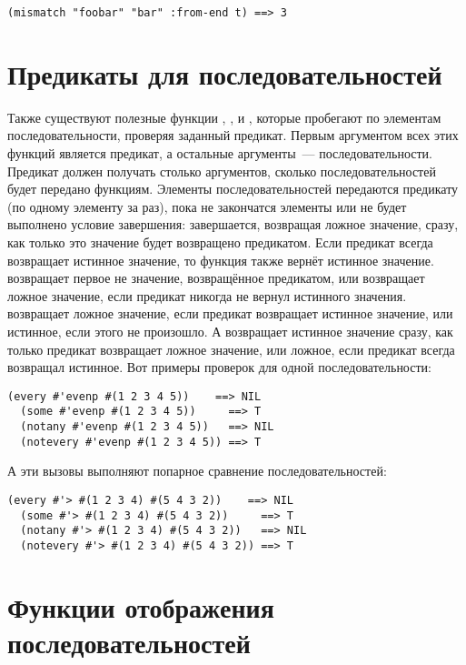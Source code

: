 \begin{lstlisting}[style=lisprepl]
  (mismatch "foobar" "bar" :from-end t) ==> 3
\end{lstlisting}

\section{Предикаты для последовательностей}

Также существуют полезные функции , ,  и
, которые пробегают по элементам последовательности, проверяя заданный
предикат.  Первым аргументом всех этих функций является предикат, а остальные аргументы~---
последовательности.  Предикат должен получать столько аргументов, сколько
последовательностей будет передано функциям.  Элементы последовательностей передаются
предикату (по одному элементу за раз), пока не закончатся элементы или не будет выполнено
условие завершения:  завершается, возвращая ложное значение, сразу, как только это
значение будет возвращено предикатом.  Если предикат всегда возвращает истинное значение,
то функция также вернёт истинное значение.   возвращает первое не 
значение, возвращённое предикатом, или возвращает ложное значение, если предикат никогда
не вернул истинного значения.  возвращает ложное значение, если предикат
возвращает истинное значение, или истинное, если этого не произошло.  А 
возвращает истинное значение сразу, как только предикат возвращает ложное значение, или
ложное, если предикат всегда возвращал истинное.  Вот примеры проверок для одной
последовательности:

\begin{lstlisting}[style=lisprepl]
  (every #'evenp #(1 2 3 4 5))    ==> NIL
  (some #'evenp #(1 2 3 4 5))     ==> T
  (notany #'evenp #(1 2 3 4 5))   ==> NIL
  (notevery #'evenp #(1 2 3 4 5)) ==> T
\end{lstlisting}

А эти вызовы выполняют попарное сравнение последовательностей:

\begin{lstlisting}[style=lisprepl]
  (every #'> #(1 2 3 4) #(5 4 3 2))    ==> NIL
  (some #'> #(1 2 3 4) #(5 4 3 2))     ==> T
  (notany #'> #(1 2 3 4) #(5 4 3 2))   ==> NIL
  (notevery #'> #(1 2 3 4) #(5 4 3 2)) ==> T
\end{lstlisting}

\section{Функции отображения последовательностей}

